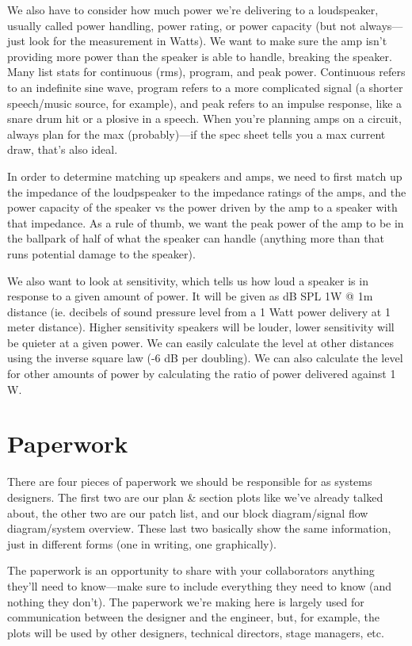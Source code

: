\documentclass[a4paper]{article}
\begin{document}
We also have to consider how much power we're delivering to a loudspeaker,
usually called power handling, power rating, or power capacity
(but not always---just look for the measurement
in Watts). We want to make sure the amp isn't providing more power than the
speaker is able to handle, breaking the speaker. Many list stats for
continuous (rms), program, and peak power. Continuous refers to an indefinite
sine wave, program refers to a more complicated signal (a shorter speech/music
source, for example), and peak refers to an impulse response, like a snare drum
hit or a plosive in a speech.
When you're planning amps on a circuit,
always plan for the max (probably)---if the spec sheet tells you a max current
draw, that's also ideal.

In order to determine matching up speakers and amps, we need to first match up
the impedance of the loudpspeaker to the impedance ratings of the amps, and the
power capacity of the speaker vs the power driven by the amp to a speaker with
that impedance. As a rule of thumb, we want the peak power of the amp to be in
the ballpark of half of what the speaker can handle (anything more than that
runs potential damage to the speaker).

We also want to look at sensitivity, which tells us how loud a speaker is in
response to a given amount of power. It will be given as dB SPL 1W @ 1m
distance (ie. decibels of sound pressure level from a 1 Watt power delivery at
1 meter distance). Higher sensitivity speakers will be louder, lower
sensitivity will be quieter at a given power. We can easily calculate the level
at other distances using the inverse square law (-6 dB per doubling). We can
also calculate the level for other amounts of power by calculating the ratio of
power delivered against 1 W.

\section{Paperwork}
There are four pieces of paperwork we should be responsible for as systems
designers. The first two are our plan \& section plots like we've already
talked about, the other two are our patch list, and our block diagram/signal
flow diagram/system overview. These last two basically show the same
information, just in different forms (one in writing, one graphically).

The paperwork is an opportunity to share with your collaborators anything
they'll need to know---make sure to include everything they need to know (and
nothing they don't). The paperwork we're making here is largely used for
communication between the designer and the engineer, but, for example, the
plots will be used by other designers, technical directors, stage managers,
etc.
\end{document}
